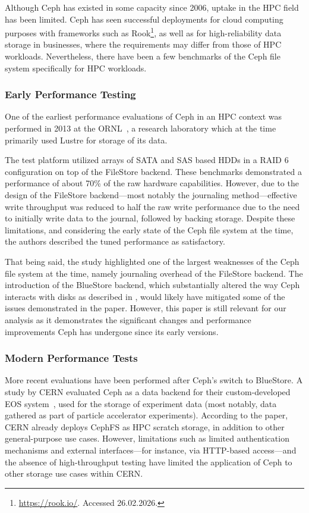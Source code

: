 Although Ceph has existed in some capacity since 2006, uptake in the \ac{HPC} field has been limited. Ceph has seen successful deployments for cloud computing purposes with frameworks such as Rook\footnote{\url{https://rook.io/}. Accessed 26.02.2026.}, as well as for high-reliability data storage in businesses, where the requirements may differ from those of \ac{HPC} workloads. Nevertheless, there have been a few benchmarks of the Ceph file system specifically for \ac{HPC} workloads.

\subsubsection{Early Performance Testing}

One of the earliest performance evaluations of Ceph in an \ac{HPC} context was
performed in 2013 at the \ac{ORNL}~\cite{ceph-ornl-evaluation-filestore}, a
research laboratory which at the time primarily used Lustre for storage of its
data.

The test platform utilized arrays of \ac{SATA} and \ac{SAS} based \acp{HDD} in a \ac{RAID} 6 configuration on top of the FileStore backend.  These benchmarks demonstrated a performance of about 70\% of the raw hardware capabilities. However, due to the design of the FileStore backend---most notably the journaling method---effective write throughput was reduced to half the raw write performance due to the need to initially write data to the journal, followed by backing storage. Despite these limitations, and considering the early state of the Ceph file system at the time, the authors described the tuned performance as satisfactory. 

That being said, the study highlighted one of the largest weaknesses of the Ceph file system at the time, namely journaling overhead of the FileStore backend. The introduction of the BlueStore backend, which substantially altered the way Ceph interacts with disks as described in , would likely have mitigated some of the issues demonstrated in the paper. However, this paper is still relevant for our analysis as it demonstrates the significant changes and performance improvements Ceph has undergone since its early versions.

\subsubsection{Modern Performance Tests}

More recent evaluations have been performed after Ceph's switch to BlueStore. A study by CERN evaluated Ceph as a data backend for their custom-developed \ac{EOS} system~\cite{cern-evaluating-cephfs-perf}, used for the storage of experiment data (most notably, data gathered as part of particle accelerator experiments). According to the paper, CERN already deploys \ac{CephFS} as \ac{HPC} scratch storage, in addition to other general-purpose use cases. However, limitations such as limited authentication mechanisms and external interfaces---for instance, via HTTP-based access---and the absence of high-throughput testing have limited the application of Ceph to other storage use cases within CERN.

